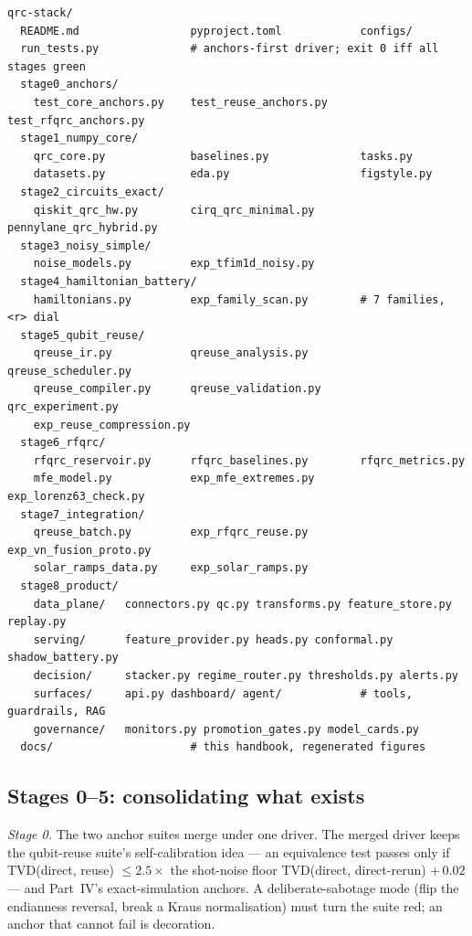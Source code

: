\begin{strip}
\begin{lstlisting}[language={},caption={Repository tree. Stages 1--5 are populated by moving verified files; Stages 6--8 are populated by the plans of Parts X--XI.},label={lst:repo-tree}]
qrc-stack/
  README.md                 pyproject.toml            configs/
  run_tests.py              # anchors-first driver; exit 0 iff all stages green
  stage0_anchors/
    test_core_anchors.py    test_reuse_anchors.py     test_rfqrc_anchors.py
  stage1_numpy_core/
    qrc_core.py             baselines.py              tasks.py
    datasets.py             eda.py                    figstyle.py
  stage2_circuits_exact/
    qiskit_qrc_hw.py        cirq_qrc_minimal.py       pennylane_qrc_hybrid.py
  stage3_noisy_simple/
    noise_models.py         exp_tfim1d_noisy.py
  stage4_hamiltonian_battery/
    hamiltonians.py         exp_family_scan.py        # 7 families, <r> dial
  stage5_qubit_reuse/
    qreuse_ir.py            qreuse_analysis.py        qreuse_scheduler.py
    qreuse_compiler.py      qreuse_validation.py      qrc_experiment.py
    exp_reuse_compression.py
  stage6_rfqrc/
    rfqrc_reservoir.py      rfqrc_baselines.py        rfqrc_metrics.py
    mfe_model.py            exp_mfe_extremes.py       exp_lorenz63_check.py
  stage7_integration/
    qreuse_batch.py         exp_rfqrc_reuse.py        exp_vn_fusion_proto.py
    solar_ramps_data.py     exp_solar_ramps.py
  stage8_product/
    data_plane/   connectors.py qc.py transforms.py feature_store.py replay.py
    serving/      feature_provider.py heads.py conformal.py shadow_battery.py
    decision/     stacker.py regime_router.py thresholds.py alerts.py
    surfaces/     api.py dashboard/ agent/            # tools, guardrails, RAG
    governance/   monitors.py promotion_gates.py model_cards.py
  docs/                     # this handbook, regenerated figures
\end{lstlisting}
\end{strip}

\subsection{Stages 0--5: consolidating what exists}
\label{sec:repo-existing}

\emph{Stage 0.} The two anchor suites merge under one driver. The merged
driver keeps the qubit-reuse suite's self-calibration idea --- an equivalence
test passes only if TVD(direct, reuse) $\le 2.5\times$ the shot-noise floor
TVD(direct, direct-rerun) $+\,0.02$ --- and Part~IV's exact-simulation
anchors. A deliberate-sabotage mode (flip the endianness reversal, break a
Kraus normalisation) must turn the suite red; an anchor that cannot fail is
decoration.

